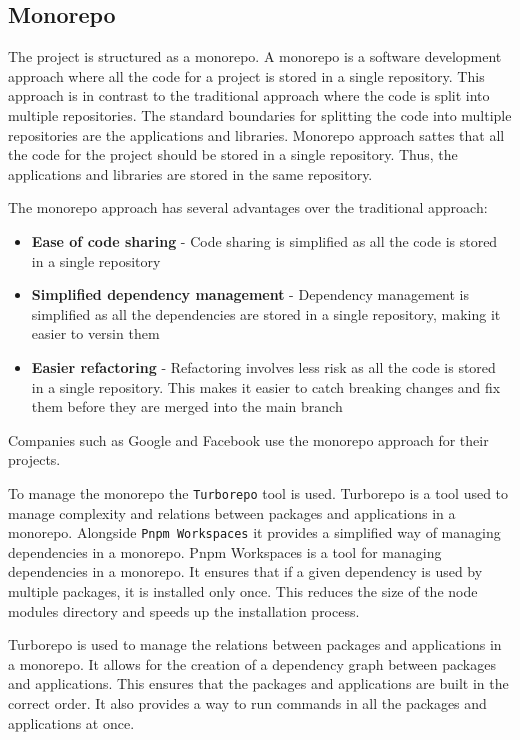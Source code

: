 \documentclass[../main.tex]{subfiles}
\begin{document}
\subsection{Monorepo}

The project is structured as a monorepo. A monorepo is a software development approach where all the code for a project is stored in a single repository.
This approach is in contrast to the traditional approach where the code is split into multiple repositories.
The standard boundaries for splitting the code into multiple repositories are the applications and libraries.
Monorepo approach sattes that all the code for the project should be stored in a single repository. Thus, the applications and libraries are stored in the same repository.

The monorepo approach has several advantages over the traditional approach:
\begin{itemize}
  \item \textbf{Ease of code sharing} - Code sharing is simplified as all the code is stored in a single repository
  \item \textbf{Simplified dependency management} - Dependency management is simplified as all the dependencies are stored in a single repository, making it easier to versin them
  \item \textbf{Easier refactoring} - Refactoring involves less risk as all the code is stored in a single repository. This makes it easier to catch breaking changes and fix them before they are merged into the main branch
\end{itemize}

Companies such as Google \cite{google-monorepo} and Facebook \cite{facebook-monorepo} use the monorepo approach for their projects.

To manage the monorepo the \texttt{Turborepo} \cite{turborepo} tool is used. Turborepo is a tool used to manage complexity and relations between packages and applications in a monorepo.
Alongside \texttt{Pnpm Workspaces} \cite{pnpm-workspaces} it provides a simplified way of managing dependencies in a monorepo. Pnpm Workspaces is a tool for managing dependencies in a monorepo.
It ensures that if a given dependency is used by multiple packages, it is installed only once. This reduces the size of the node modules directory and speeds up the installation process.

Turborepo is used to manage the relations between packages and applications in a monorepo. It allows for the creation of a dependency graph between packages and applications.
This ensures that the packages and applications are built in the correct order. It also provides a way to run commands in all the packages and applications at once.
\end{document}
